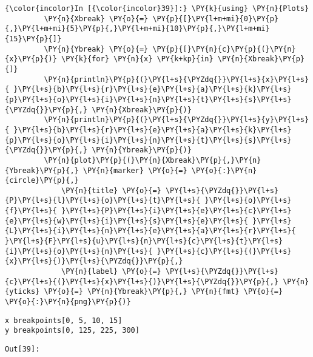 \begin{codeCell}
    \begin{Verbatim}[commandchars=\\\{\}]
{\color{incolor}In [{\color{incolor}39}]:} \PY{k}{using} \PY{n}{Plots}
         \PY{n}{Xbreak} \PY{o}{=} \PY{p}{[}\PY{l+m+mi}{0}\PY{p}{,}\PY{l+m+mi}{5}\PY{p}{,}\PY{l+m+mi}{10}\PY{p}{,}\PY{l+m+mi}{15}\PY{p}{]}
         \PY{n}{Ybreak} \PY{o}{=} \PY{p}{[}\PY{n}{c}\PY{p}{(}\PY{n}{x}\PY{p}{)} \PY{k}{for} \PY{n}{x} \PY{k+kp}{in} \PY{n}{Xbreak}\PY{p}{]}
         \PY{n}{println}\PY{p}{(}\PY{l+s}{\PYZdq{}}\PY{l+s}{x}\PY{l+s}{ }\PY{l+s}{b}\PY{l+s}{r}\PY{l+s}{e}\PY{l+s}{a}\PY{l+s}{k}\PY{l+s}{p}\PY{l+s}{o}\PY{l+s}{i}\PY{l+s}{n}\PY{l+s}{t}\PY{l+s}{s}\PY{l+s}{\PYZdq{}}\PY{p}{,} \PY{n}{Xbreak}\PY{p}{)}
         \PY{n}{println}\PY{p}{(}\PY{l+s}{\PYZdq{}}\PY{l+s}{y}\PY{l+s}{ }\PY{l+s}{b}\PY{l+s}{r}\PY{l+s}{e}\PY{l+s}{a}\PY{l+s}{k}\PY{l+s}{p}\PY{l+s}{o}\PY{l+s}{i}\PY{l+s}{n}\PY{l+s}{t}\PY{l+s}{s}\PY{l+s}{\PYZdq{}}\PY{p}{,} \PY{n}{Ybreak}\PY{p}{)}
         \PY{n}{plot}\PY{p}{(}\PY{n}{Xbreak}\PY{p}{,}\PY{n}{Ybreak}\PY{p}{,} \PY{n}{marker} \PY{o}{=} \PY{o}{:}\PY{n}{circle}\PY{p}{,} 
             \PY{n}{title} \PY{o}{=} \PY{l+s}{\PYZdq{}}\PY{l+s}{P}\PY{l+s}{l}\PY{l+s}{o}\PY{l+s}{t}\PY{l+s}{ }\PY{l+s}{o}\PY{l+s}{f}\PY{l+s}{ }\PY{l+s}{P}\PY{l+s}{i}\PY{l+s}{e}\PY{l+s}{c}\PY{l+s}{e}\PY{l+s}{w}\PY{l+s}{i}\PY{l+s}{s}\PY{l+s}{e}\PY{l+s}{ }\PY{l+s}{L}\PY{l+s}{i}\PY{l+s}{n}\PY{l+s}{e}\PY{l+s}{a}\PY{l+s}{r}\PY{l+s}{ }\PY{l+s}{F}\PY{l+s}{u}\PY{l+s}{n}\PY{l+s}{c}\PY{l+s}{t}\PY{l+s}{i}\PY{l+s}{o}\PY{l+s}{n}\PY{l+s}{ }\PY{l+s}{c}\PY{l+s}{(}\PY{l+s}{x}\PY{l+s}{)}\PY{l+s}{\PYZdq{}}\PY{p}{,} 
             \PY{n}{label} \PY{o}{=} \PY{l+s}{\PYZdq{}}\PY{l+s}{c}\PY{l+s}{(}\PY{l+s}{x}\PY{l+s}{)}\PY{l+s}{\PYZdq{}}\PY{p}{,} \PY{n}{yticks} \PY{o}{=} \PY{n}{Ybreak}\PY{p}{,} \PY{n}{fmt} \PY{o}{=} \PY{o}{:}\PY{n}{png}\PY{p}{)}
\end{Verbatim}


    \begin{Verbatim}[commandchars=\\\{\}]
x breakpoints[0, 5, 10, 15]
y breakpoints[0, 125, 225, 300]

    \end{Verbatim}
\texttt{\color{outcolor}Out[{\color{outcolor}39}]:}
    
    \begin{center}
    \end{center}
    { \hspace*{\fill} \\}
    


\end{codeCell}
